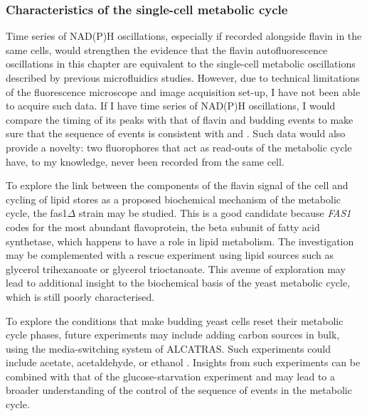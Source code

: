 
\subsubsection{Characteristics of the single-cell metabolic cycle}
\label{subsec:biology-discussion-caveats-characteristics}

Time series of NAD(P)H oscillations, especially if recorded alongside flavin in the same cells, would strengthen the evidence that the flavin autofluorescence oscillations in this chapter are equivalent to the single-cell metabolic oscillations described by previous microfluidics studies.
However, due to technical limitations of the fluorescence microscope and image acquisition set-up, I have not been able to acquire such data.
If I have time series of NAD(P)H oscillations, I would compare the timing of its peaks with that of flavin and budding events to make sure that the sequence of events is consistent with \textcite{papagiannakisAutonomousMetabolicOscillations2017} and \textcite{baumgartnerFlavinbasedMetabolicCycles2018}.
Such data would also provide a novelty: two fluorophores that act as read-outs of the metabolic cycle have, to my knowledge, never been recorded from the same cell.

To explore the link between the components of the flavin signal of the cell and cycling of lipid stores as a proposed biochemical mechanism of the metabolic cycle, the fas1$\Delta$ strain may be studied.
This is a good candidate because \textit{FAS1} codes for the most abundant flavoprotein, the beta subunit of fatty acid synthetase, which happens to have a role in lipid metabolism.
The investigation may be complemented with a rescue experiment using lipid sources such as glycerol trihexanoate or glycerol trioctanoate.
This avenue of exploration may lead to additional insight to the biochemical basis of the yeast metabolic cycle, which is still poorly characterised.

To explore the conditions that make budding yeast cells reset their metabolic cycle phases, future experiments may include adding carbon sources in bulk, using the media-switching system of ALCATRAS.
Such experiments could include acetate, acetaldehyde, or ethanol \parencite{kuangMsn2RegulateExpression2017, krishnaMinimalPushPull2018}.
Insights from such experiments can be combined with that of the glucose-starvation experiment and may lead to a broader understanding of the control of the sequence of events in the metabolic cycle.

